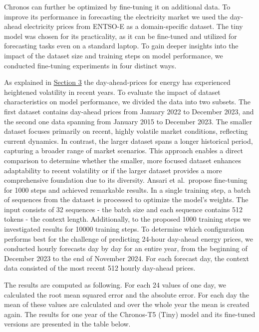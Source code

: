 \documentclass[a4paper]{article}
\begin{document}
    Chronos can further be optimized by fine-tuning it on additional data.
To improve its performance in forecasting the electricity market we used
the day-ahead electricity prices from ENTSO-E as a domain-specific
dataset. The tiny model was chosen for its practicality, as it can be
fine-tuned and utilized for forecasting tasks even on a standard laptop.
To gain deeper insights into the impact of the dataset size and training
steps on model performance, we conducted fine-tuning experiments in four
distinct ways.

As explained in \hyperref[gathering-domain-knowledge]{Section 3} the
day-ahead-prices for energy has experienced heightened volatility in
recent years. To evaluate the impact of dataset characteristics on model
performance, we divided the data into two subsets. The first dataset
contains day-ahead prices from January 2022 to December 2023, and the
second one data spanning from January 2015 to December 2023. The smaller
dataset focuses primarily on recent, highly volatile market conditions,
reflecting current dynamics. In contrast, the larger dataset spans a
longer historical period, capturing a broader range of market scenarios.
This approach enables a direct comparison to determine whether the
smaller, more focused dataset enhances adaptability to recent volatility
or if the larger dataset provides a more comprehensive foundation due to
its diversity. Ansari et al.~propose fine-tuning for 1000 steps and
achieved remarkable results. In a single training step, a batch of
sequences from the dataset is processed to optimize the model's weights.
The input consists of 32 sequences - the batch size and each sequence
contains 512 tokens - the context length. Additionally, to the proposed
1000 training steps we investigated results for 10000 training steps. To
determine which configuration performs best for the challenge of
predicting 24-hour day-ahead energy prices, we conducted hourly
forecasts day by day for an entire year, from the beginning of December
2023 to the end of November 2024. For each forecast day, the context
data consisted of the most recent 512 hourly day-ahead prices.

    The results are computed as following. For each 24 values of one day, we
calculated the root mean squared error and the absolute error. For each
day the mean of these values are calculated and over the whole year the
mean is created again. The results for one year of the Chronos-T5 (Tiny)
model and its fine-tuned versions are presented in the table below.
\end{document}
